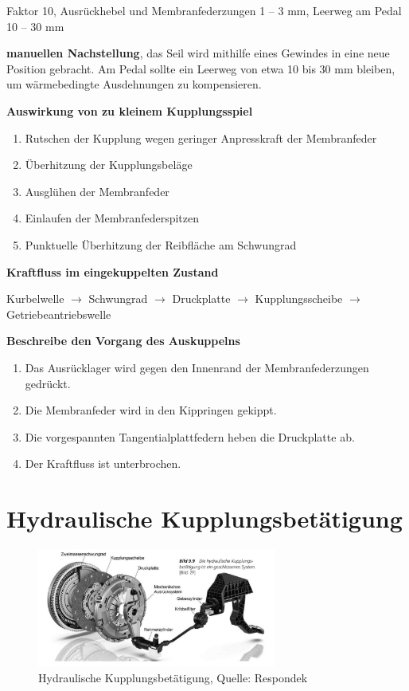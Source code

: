 Faktor 10, Ausrückhebel und Membranfederzungen 1 -- 3 mm, Leerweg am
Pedal 10 -- 30 mm

\textbf{manuellen Nachstellung}, das Seil wird mithilfe eines Gewindes
in eine neue Position gebracht. Am Pedal sollte ein Leerweg von etwa 10
bis 30 mm bleiben, um wärmebedingte Ausdehnungen zu kompensieren.

\textbf{Auswirkung von zu kleinem Kupplungsspiel}

\begin{enumerate}
\item
  Rutschen der Kupplung wegen geringer Anpresskraft der Membranfeder
\item
  Überhitzung der Kupplungsbeläge
\item
  Ausglühen der Membranfeder
\item
  Einlaufen der Membranfederspitzen
\item
  Punktuelle Überhitzung der Reibfläche am Schwungrad
\end{enumerate}

\textbf{Kraftfluss im eingekuppelten Zustand}

Kurbelwelle $\to$ Schwungrad $\to$ Druckplatte $\to$
Kupplungsscheibe $\to$ Getriebeantriebswelle

\textbf{Beschreibe den Vorgang des Auskuppelns}

\begin{enumerate}
\item
  Das Ausrücklager wird gegen den Innenrand der Membranfederzungen
  gedrückt.
\item
  Die Membranfeder wird in den Kippringen gekippt.
\item
  Die vorgespannten Tangentialplattfedern heben die Druckplatte ab.
\item
  Der Kraftfluss ist unterbrochen.
\end{enumerate}

\newpage

\section{Hydraulische
Kupplungsbetätigung}\label{hydraulische-kupplungsbetaetigung}

\begin{figure}[!ht]%
\centering
\includegraphics[width=0.7\textwidth]{images/Kupplung/Kupplung-1.pdf}
\caption{Hydraulische Kupplungsbetätigung, Quelle: Respondek}
\end{figure}

